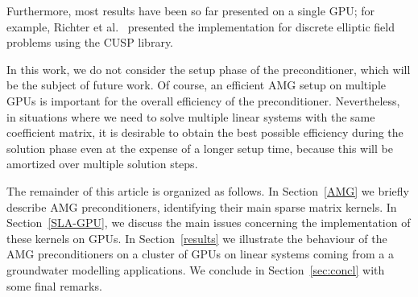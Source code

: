 
Furthermore, most results have been so far presented on a single GPU; 
for example, Richter et al.~\cite{Richter:2014} presented the implementation for discrete elliptic field problems 
using the CUSP library. 

In this work, we do not consider the setup phase of the preconditioner,
which will be the subject of future work. 
Of course, an efficient AMG setup on multiple GPUs is important for the overall efficiency of the
preconditioner. Nevertheless, in situations where we need to solve multiple
linear systems with the same coefficient matrix, it is desirable to obtain
the best possible efficiency during the solution phase even at the expense of a
longer setup time, because this will be amortized over multiple
solution steps.

The remainder of this article is organized as follows. In Section~\ref{AMG} we briefly describe AMG preconditioners,
identifying their main sparse matrix kernels. In Section~\ref{SLA-GPU}, we discuss the main issues
concerning the implementation of these kernels on GPUs. In Section~\ref{results} we illustrate the
behaviour of the AMG preconditioners on a cluster of GPUs on linear systems coming from a
a groundwater modelling applications. 
We conclude in Section~\ref{sec:concl} with some final remarks.  